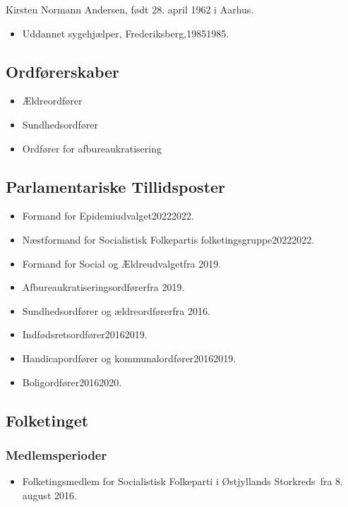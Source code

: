 \documentclass[11pt, a4paper]{awesome-cv}
\begin{document}
\makecvheader[R]
\makelettertitle
\begin{cvletter}
Kirsten Normann Andersen, født 28. april 1962 i Aarhus.

\begin{itemize}
\item Uddannet sygehjælper, Frederiksberg,19851985.
\end{itemize}
\subsection*{Ordførerskaber}
\begin{itemize}
\item Ældreordfører
\item Sundhedsordfører
\item Ordfører for afbureaukratisering
\end{itemize}
\subsection*{Parlamentariske Tillidsposter}
\begin{itemize}
\item Formand for Epidemiudvalget20222022.
\item Næstformand for Socialistisk Folkepartis folketingsgruppe20222022.
\item Formand for Social og Ældreudvalgetfra 2019.
\item Afbureaukratiseringsordførerfra 2019.
\item Sundhedsordfører og ældreordførerfra 2016.
\item Indfødsretsordfører20162019.
\item Handicapordfører og kommunalordfører20162019.
\item Boligordfører20162020.
\end{itemize}
\subsection*{Folketinget}
\subsubsection*{Medlemsperioder}
\begin{itemize}
\item Folketingsmedlem for Socialistisk Folkeparti i Østjyllands Storkreds fra 8. august 2016.
\end{itemize}

\end{cvletter}
\end{document}
